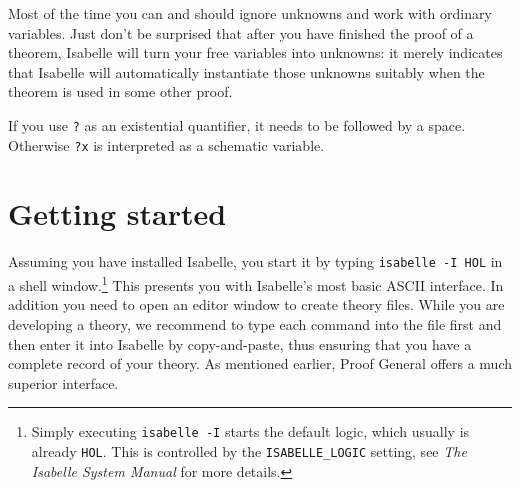 Most of the time you can and should ignore unknowns and work with ordinary
variables. Just don't be surprised that after you have finished the proof of
a theorem, Isabelle will turn your free variables into unknowns: it merely
indicates that Isabelle will automatically instantiate those unknowns
suitably when the theorem is used in some other proof.
\begin{warn}
  If you use \texttt{?} as an existential
  quantifier, it needs to be followed by a space. Otherwise \texttt{?x} is
  interpreted as a schematic variable.
\end{warn}

\section{Getting started}

Assuming you have installed Isabelle, you start it by typing \texttt{isabelle
  -I HOL} in a shell window.\footnote{Simply executing \texttt{isabelle -I}
  starts the default logic, which usually is already \texttt{HOL}.  This is
  controlled by the \texttt{ISABELLE_LOGIC} setting, see \emph{The Isabelle
    System Manual} for more details.} This presents you with Isabelle's most
basic ASCII interface.  In addition you need to open an editor window to
create theory files.  While you are developing a theory, we recommend to
type each command into the file first and then enter it into Isabelle by
copy-and-paste, thus ensuring that you have a complete record of your theory.
As mentioned earlier, Proof General offers a much superior interface.
